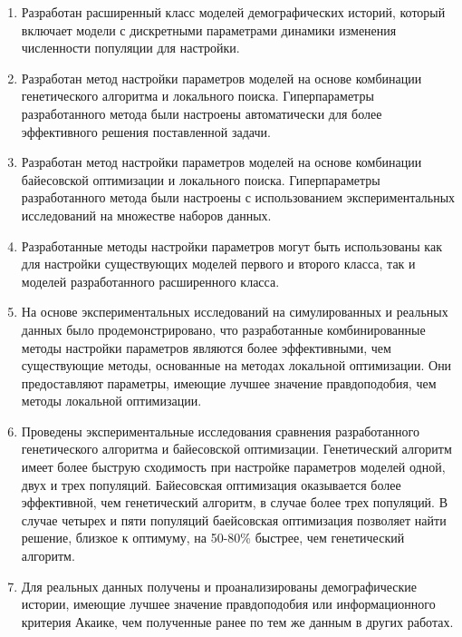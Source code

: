 \begin{enumerate}[label={\arabic*.}]
    \item Разработан расширенный класс моделей демографических историй, который включает модели с дискретными параметрами динамики изменения численности популяции для настройки.
    \item Разработан метод настройки параметров моделей на основе комбинации генетического алгоритма и локального поиска.
    Гиперпараметры разработанного метода были настроены автоматически для более эффективного решения поставленной задачи.
    \item Разработан метод настройки параметров моделей на основе комбинации байесовской оптимизации и локального поиска.
    Гиперпараметры разработанного метода были настроены с использованием экспериментальных исследований на множестве наборов данных.
    \item Разработанные методы настройки параметров могут быть использованы как для настройки существующих моделей первого и второго класса, так и моделей разработанного расширенного класса.
    \item На основе экспериментальных исследований на симулированных и реальных данных было продемонстрировано, что разработанные комбинированные методы настройки параметров являются более эффективными, чем существующие методы, основанные на методах локальной оптимизации.
    Они предоставляют параметры, имеющие лучшее значение правдоподобия, чем методы локальной оптимизации.
    \item Проведены экспериментальные исследования сравнения разработанного генетического алгоритма и байесовской оптимизации.
    Генетический алгоритм имеет более быструю сходимость при настройке параметров моделей одной, двух и трех популяций.
    Байесовская оптимизация оказывается более эффективной, чем генетический алгоритм, в случае более трех популяций.
    В случае четырех и пяти популяций баейсовская оптимизация позволяет найти решение, близкое к оптимуму, на 50-80\% быстрее, чем генетический алгоритм.
    \item Для реальных данных получены и проанализированы демографические истории, имеющие лучшее значение правдоподобия или информационного критерия Акаике, чем полученные ранее по тем же данным в других работах.
\end{enumerate}

\clearpage
